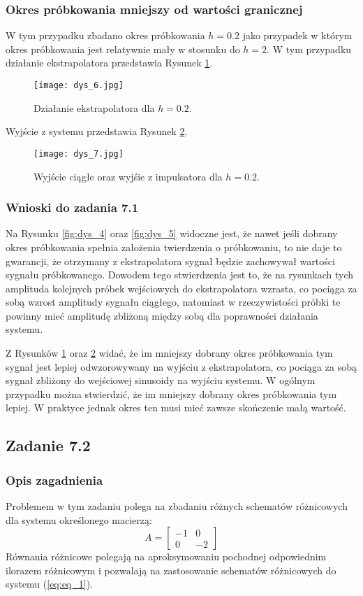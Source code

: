 \documentclass[a4paper,11pt]{article}
\begin{document}
\subsubsection{Okres próbkowania mniejszy od wartości granicznej}
W tym przypadku zbadano okres próbkowania \( h = 0.2 \) jako przypadek w którym okres próbkowania jest relatywnie mały w stosunku do \( h = 2 \). 
W tym przypadku działanie ekstrapolatora przedstawia Rysunek \ref{fig:dys_6}.

\begin{figure}[H]
\centerline{\texttt{[image: dys\_6.jpg]}}
\caption{Działanie ekstrapolatora dla \( h = 0.2 \).}
\label{fig:dys_6}
\end{figure}

Wyjście z systemu przedstawia Rysunek \ref{fig:dys_7}. 
\begin{figure}[H]
\centerline{\texttt{[image: dys\_7.jpg]}}
\caption{Wyjście ciągłe oraz wyjśie z impulsatora dla \( h = 0.2 \).}
\label{fig:dys_7}
\end{figure}

\subsubsection{Wnioski do zadania 7.1}
Na Rysunku \ref{fig:dys_4} oraz \ref{fig:dys_5} widoczne jest, że nawet jeśli dobrany okres próbkowania spełnia założenia twierdzenia o próbkowaniu, to nie daje to gwarancji, że otrzymany z ekstrapolatora sygnał będzie zachowywał wartości sygnału próbkowanego. Dowodem tego stwierdzenia jest to, że na rysunkach tych amplituda kolejnych próbek wejściowych do ekstrapolatora wzrasta, co pociąga za sobą wzrost amplitudy sygnału ciągłego, natomiast w rzeczywistości próbki te powinny mieć amplitudę zbliżoną między sobą dla poprawności działania systemu.

Z Rysunków \ref{fig:dys_6} oraz \ref{fig:dys_7} widać, że im mniejszy dobrany okres próbkowania tym sygnał jest lepiej odwzorowywany na wyjściu z ekstrapolatora, co pociąga za sobą sygnał zbliżony do wejściowej sinusoidy na wyjściu systemu. W ogólnym przypadku można stwierdzić, że im mniejszy dobrany okres próbkowania tym lepiej. W praktyce jednak okres ten musi mieć zawsze skończenie małą wartość. 

\subsection{Zadanie 7.2}
\subsubsection{Opis zagadnienia}
Problemem w tym zadaniu polega na zbadaniu różnych schematów różnicowych dla systemu określonego macierzą:
\begin{equation*}
A = 
\begin{bmatrix}
-1 & 0 \\ 
0 & -2
\end{bmatrix}
\end{equation*}
Równania różnicowe polegają na aproksymowaniu pochodnej odpowiednim ilorazem różnicowym i pozwalają na zastosowanie schematów różnicowych do systemu (\ref{eq:eq_1}). 
\end{document}
